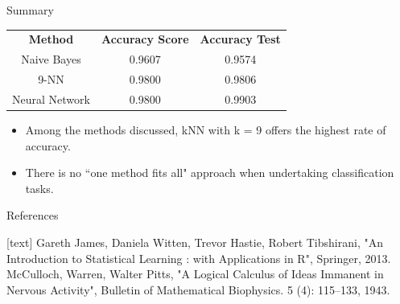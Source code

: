 \documentclass[aspectratio=1610, t]{beamer}\usepackage[]{graphicx}\usepackage[]{color}
\begin{document}
\begin{frame}[t]{Summary}

\begin{center}
\begin{tabular}{ c c c }
 \textbf{Method} & \textbf{Accuracy Score}  & \textbf{Accuracy Test} \\
 Naive Bayes & 0.9607 &  0.9574 \\
 9-NN & 0.9800 & 0.9806 \\
 Neural Network & 0.9800  & 0.9903  
\end{tabular}

\begin{itemize}
  \item Among the methods discussed, kNN with k = 9 offers the highest rate of accuracy.
  \item There is no ``one method fits all" approach when undertaking classification tasks.
\end{itemize}
\end{center}
        
\end{frame}




\begin{frame}{References}
\begin{thebibliography}{10}
[text]
Gareth James, Daniela Witten, Trevor Hastie, Robert Tibshirani, "An Introduction to Statistical Learning : with Applications in R", Springer, 2013.
McCulloch, Warren, Walter Pitts, "A Logical Calculus of Ideas Immanent in Nervous Activity", Bulletin of Mathematical Biophysics. 5 (4): 115–133, 1943.

\end{thebibliography}

\end{frame}

\end{document}
